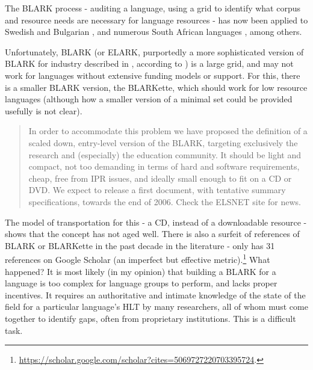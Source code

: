 The BLARK process - auditing a language, using a grid to identify what corpus and resource needs are necessary for language resources - has now been applied to Swedish \citep{elenius2008language} and Bulgarian \citep{simov2004language}, and numerous South African languages \citep{grover2011south}, among others.

Unfortunately, BLARK (or ELARK, purportedly a more sophisticated version of BLARK for industry described in \citet{mapelli2003report}, according to \citep{grover2011south}) is a large grid, and may not work for languages without extensive funding models or support. For this, there is a smaller BLARK version, the BLARKette, which should work for low resource languages (although how a smaller version of a minimal set could be provided usefully is not clear).

\begin{quote}
In order to accommodate this problem we have proposed the definition of a scaled down, entry-level version of the BLARK, targeting exclusively the research and (especially) the education community. It should be light and compact, not too demanding in terms of hard and software requirements, cheap, free from IPR issues, and ideally small enough to fit on a CD or DVD. We expect to release a first document, with tentative summary specifications, towards the end of 2006. Check the ELSNET site for news. \citep{krauwer2006strengthening}
\end{quote}

The model of transportation for this - a CD, instead of a downloadable resource - shows that the concept has not aged well. There is also a surfeit of references of BLARK or BLARKette in the past decade in the literature - \citet{krauwer1998elsnet} only has 31 references on Google Scholar (an imperfect but effective metric).\footnote{\href{https://scholar.google.com/scholar?cites=5069727220703395724}{https://scholar.google.com/scholar?cites=5069727220703395724}. } What happened? It is most likely (in my opinion) that building a BLARK for a language is too complex for language groups to perform, and lacks proper incentives. It requires an authoritative and intimate knowledge of the state of the field for a particular language's HLT by many researchers, all of whom must come together to identify gaps, often from proprietary institutions. This is a difficult task.

